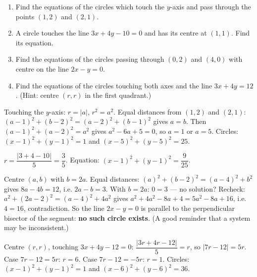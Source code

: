 \documentclass[11pt]{article}
\begin{document}
\begin{exercice}
\begin{enumerate}
\item Find the equations of the circles which touch the $y$-axis and pass through the points $(1,2)$ and $(2,1)$.
\item A circle touches the line $3x+4y-10=0$ and has its centre at $(1,1)$. Find its equation.
\item Find the equations of the circles passing through $(0,2)$ and $(4,0)$ with centre on the line $2x-y=0$.
\item Find the equations of the circles touching both axes and the line $3x+4y=12$. (Hint: centre $(r,r)$ in the first quadrant.)
\end{enumerate}
\end{exercice}

\begin{corrige}[Exercise 1]
Touching the $y$-axis: $r=|a|$, $r^2=a^2$. Equal distances from $(1,2)$ and $(2,1)$: $(a-1)^2+(b-2)^2=(a-2)^2+(b-1)^2$ gives $a=b$. Then $(a-1)^2+(a-2)^2=a^2$ gives $a^2-6a+5=0$, so $a=1$ or $a=5$. Circles: $(x-1)^2+(y-1)^2=1$ and $(x-5)^2+(y-5)^2=25$.
\end{corrige}

\begin{corrige}[Exercise 2]
$r=\dfrac{|3+4-10|}{5}=\dfrac{3}{5}$. Equation: $(x-1)^2+(y-1)^2=\dfrac{9}{25}$.
\end{corrige}

\begin{corrige}[Exercise 3]
Centre $(a,b)$ with $b=2a$. Equal distances: $(a)^2+(b-2)^2=(a-4)^2+b^2$ gives $8a-4b=12$, i.e. $2a-b=3$. With $b=2a$: $0=3$ — no solution? Recheck: $a^2+(2a-2)^2=(a-4)^2+4a^2$ gives $a^2+4a^2-8a+4=5a^2-8a+16$, i.e. $4=16$, contradiction. So the line $2x-y=0$ is parallel to the perpendicular bisector of the segment: \textbf{no such circle exists}. (A good reminder that a system may be inconsistent.)
\end{corrige}

\begin{corrige}[Exercise 4]
Centre $(r,r)$, touching $3x+4y-12=0$: $\dfrac{|3r+4r-12|}{5}=r$, so $|7r-12|=5r$. Case $7r-12=5r$: $r=6$. Case $7r-12=-5r$: $r=1$. Circles: $(x-1)^2+(y-1)^2=1$ and $(x-6)^2+(y-6)^2=36$.
\end{corrige}
\end{document}
